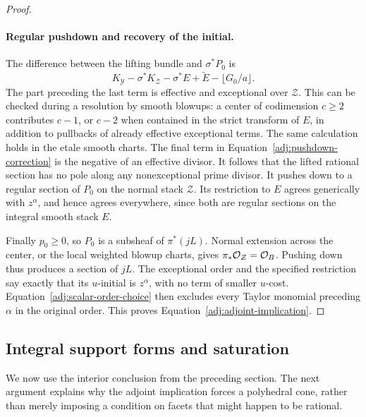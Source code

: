 \begin{proof}
\paragraph{Regular pushdown and recovery of the initial.}
The difference between the lifting bundle and $\sigma^*P_0$ is
\begin{equation}\label{adj:pushdown-correction}
 K_{\mathcal Y}-\sigma^*K_{\mathcal Z}
       -\sigma^*E+\widetilde E-\lfloor G_0/a\rfloor.
\end{equation}
The part preceding the last term is effective and exceptional over
$\mathcal Z$.  This can be checked during a resolution by smooth
blowups: a center of codimension $c\ge2$ contributes $c-1$, or
$c-2$ when contained in the strict transform of $E$, in addition
to pullbacks of already effective exceptional terms.  The same
calculation holds in the etale smooth charts.  The final term in
Equation~\eqref{adj:pushdown-correction} is the negative of an
effective divisor.  It follows that the lifted rational section has
no pole along any nonexceptional prime divisor.  It pushes down to
a regular section of $P_0$ on the normal stack $\mathcal Z$.
Its restriction to $E$ agrees generically with $z^\alpha$, and hence
agrees everywhere, since both are regular sections on the integral
smooth stack $E$.

Finally $p_0\ge0$, so $P_0$ is a subsheaf of $\pi^*(jL)$.
Normal extension across the center, or the local weighted blowup
charts, gives $\pi_*\mathcal O_{\mathcal Z}=\mathcal O_B$.  Pushing down thus
produces a section of $jL$.  The exceptional order and the specified
restriction say exactly that its $u$-initial is $z^\alpha$, with no
term of smaller $u$-cost.  Equation~\eqref{adj:scalar-order-choice}
then excludes every Taylor monomial preceding $\alpha$ in the
original order.  This proves Equation~\eqref{adj:adjoint-implication}.
\end{proof}

\subsection{Integral support forms and saturation}

We now use the interior conclusion from the preceding section.
The next argument explains why the adjoint implication forces a
polyhedral cone, rather than merely imposing a condition on facets
that might happen to be rational.

